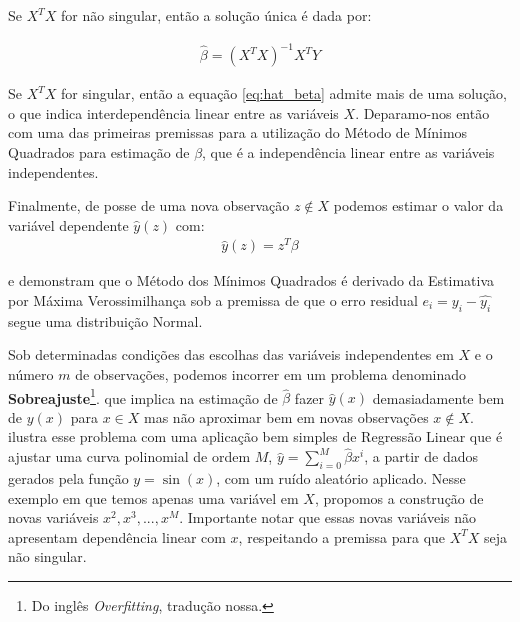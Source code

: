Se $ X^TX  $ for não singular, então a solução única é dada por:

\begin{align}\label{eq:hat_beta}
\hat{\beta} = (X^TX)^{-1}X^TY
\end{align} 

Se $ X^TX $ for singular, então a equação \ref{eq:hat_beta} admite mais de uma solução, o que indica interdependência linear entre as variáveis $ X $. Deparamo-nos então com uma das primeiras premissas para a utilização do Método de Mínimos Quadrados para estimação de $ \beta $, que é a independência linear entre as variáveis independentes.


Finalmente, de posse de uma nova observação $ z \notin X $ podemos estimar o valor da variável dependente $ \hat{y}(z) $ com:
\begin{align}
\hat{y}(z) = z^T\beta
\end{align}


%
%
%



\cite[p.140-143]{Bishop} e \cite[p.178-180]{Andersen} demonstram que o Método dos Mínimos Quadrados é derivado da Estimativa por Máxima Verossimilhança sob a premissa de que o erro residual $ e_i = y_i - \hat{y_i} $ segue uma distribuição Normal.

Sob determinadas condições das escolhas das variáveis independentes em $ X $ e o número $ m $  de observações, podemos incorrer em um problema denominado \textbf{Sobreajuste}\footnote{Do inglês \textit{Overfitting}, tradução nossa.}\cite[p.]{Bishop}. que implica na estimação de $ \hat{\beta} $ fazer $ \hat{y}(x) $ demasiadamente bem de $ y(x) $ para $ x \in X $ mas não aproximar bem em novas observações $ x \notin X $. \cite[p.4-9]{Bishop} ilustra esse problema com uma aplicação bem simples de Regressão Linear que é ajustar uma curva polinomial de ordem $ M $, $ \hat{y} = \sum_{i=0}^M \hat{\beta}x^i$, a partir de dados gerados pela função $ y = \sin(x) $, com um ruído aleatório aplicado. Nesse exemplo em que temos apenas uma variável em $ X $, propomos a construção de novas variáveis  $ x^2, x^3, ..., x^M $. Importante notar que essas novas variáveis não apresentam dependência linear com $ x $, respeitando a premissa para que $ X^TX $ seja não singular. 


